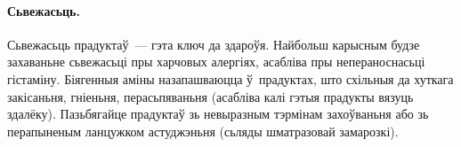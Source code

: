 \paragraph{Сьвежасьць.}
Сьвежасьць прадуктаў~--- гэта ключ да здароўя. Найбольш карысным будзе захаваньне сьвежасьці пры харчовых алергіях, асабліва пры непераноснасьці гістаміну. Біягенныя аміны назапашваюцца ў~прадуктах, што схільныя да хуткага закісаньня, гніеньня, перасьпяваньня (асабліва калі гэтыя прадукты вязуць здалёку). Пазьбягайце прадуктаў зь невыразным тэрмінам захоўваньня або зь перапыненым ланцужком астуджэньня (сьляды шматразовай замарозкі).
